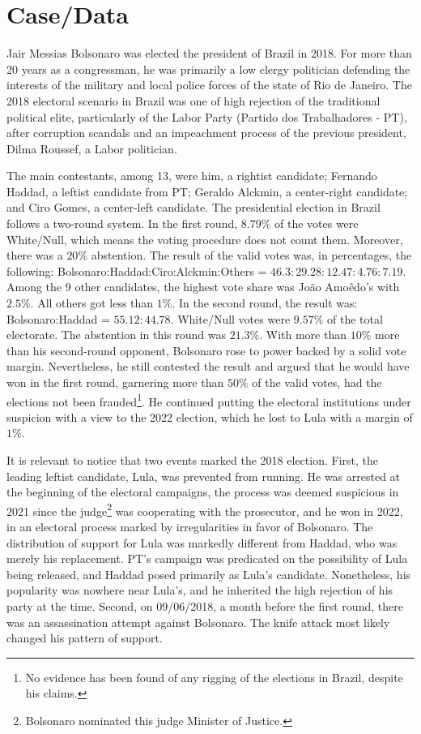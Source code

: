 \documentclass[hidelinks,11pt]{article} \usepackage[utf8]{inputenc}
\begin{document}
\section{Case/Data}

Jair Messias Bolsonaro was elected the president of Brazil in 2018. For more
than 20 years as a congressman, he was primarily a low clergy politician
defending the interests of the military and local police forces of the state of
Rio de Janeiro. The 2018 electoral scenario in Brazil was one of high rejection
of the traditional political elite, particularly of the Labor Party (Partido dos
Trabalhadores - PT), after corruption scandals and an impeachment process of the
previous president, Dilma Roussef, a Labor politician.


The main contestants, among 13, were him, a rightist candidate; Fernando Haddad,
a leftist candidate from PT; Geraldo Alckmin, a center-right candidate; and Ciro
Gomes, a center-left candidate. The presidential election in Brazil follows a
two-round system. In the first round, \(8.79\%\) of the votes were White/Null,
which means the voting procedure does not count them. Moreover, there was a
\(20\%\) abstention. The result of the valid votes was, in percentages, the
following: Bolsonaro:Haddad:Ciro:Alckmin:Others =
\(46.3:29.28:12.47:4.76:7.19 \). Among the 9 other candidates, the highest vote
share was Jo{\~a}o Amo{\^e}do's with \(2.5\%\). All others got less than
\(1\%\). In the second round, the result was: Bolsonaro:Haddad =
\(55.12 : 44.78 \). White/Null votes were \(9.57\%\) of the total electorate.
The abstention in this round was \(21.3\%\). With more than \(10\%\) more than
his second-round opponent, Bolsonaro rose to power backed by a solid vote margin. Nevertheless, he still contested the result and argued that he would
have won in the first round, garnering more than \(50\%\) of the valid votes,
had the elections not been frauded\footnote{No evidence has been found of any
  rigging of the elections in Brazil, despite his claims.}. He continued putting
the electoral institutions under suspicion with a view to the 2022 election,
which he lost to Lula with a margin of \(1\%\).


It is relevant to notice that two events marked the 2018 election. First, the
leading leftist candidate, Lula, was prevented from running. He was arrested at
the beginning of the electoral campaigns, the process was deemed suspicious in
2021 since the judge\footnote{Bolsonaro nominated this judge Minister of
Justice.} was cooperating with the prosecutor, and he won in 2022, in an
electoral process marked by irregularities in favor of Bolsonaro. The
distribution of support for Lula was markedly different from Haddad, who was
merely his replacement. PT's campaign was predicated on the possibility of Lula
being released, and Haddad posed primarily as Lula's candidate. Nonetheless, his
popularity was nowhere near Lula's, and he inherited the high rejection of his
party at the time. Second, on 09/06/2018, a month before the first round, there
was an assassination attempt against Bolsonaro. The knife attack most likely
changed his pattern of support.
\end{document}
